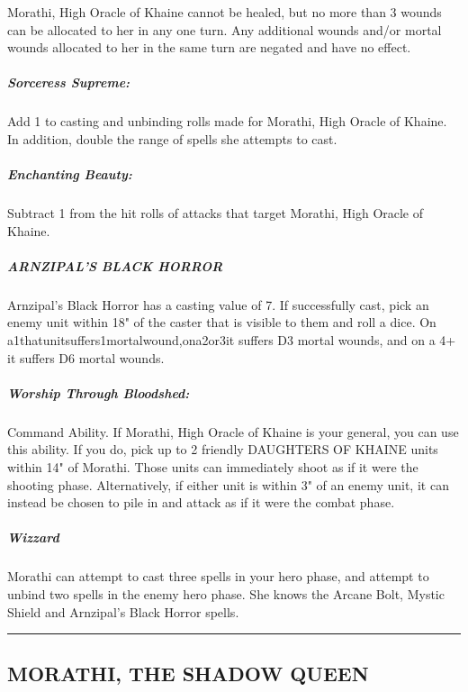 Morathi, High Oracle of Khaine cannot be healed, but no more than 3
wounds can be allocated to her in any one turn. Any additional wounds
and/or mortal wounds allocated to her in the same turn are negated and
have no effect.

\hypertarget{sorceress-supreme}{%
\subparagraph{Sorceress Supreme:}\label{sorceress-supreme}}

Add 1 to casting and unbinding rolls made for Morathi, High Oracle of
Khaine. In addition, double the range of spells she attempts to cast.

\hypertarget{enchanting-beauty}{%
\subparagraph{Enchanting Beauty:}\label{enchanting-beauty}}

Subtract 1 from the hit rolls of attacks that target Morathi, High
Oracle of Khaine.

\hypertarget{arnzipals-black-horror}{%
\subparagraph{ARNZIPAL'S BLACK HORROR}\label{arnzipals-black-horror}}

Arnzipal's Black Horror has a casting value of 7. If successfully cast,
pick an enemy unit within 18" of the caster that is visible to them and
roll a dice. On a1thatunitsuffers1mortalwound,ona2or3it suffers D3
mortal wounds, and on a 4+ it suffers D6 mortal wounds.

\hypertarget{worship-through-bloodshed}{%
\subparagraph{Worship Through
Bloodshed:}\label{worship-through-bloodshed}}

Command Ability. If Morathi, High Oracle of Khaine is your general, you
can use this ability. If you do, pick up to 2 friendly DAUGHTERS OF
KHAINE units within 14" of Morathi. Those units can immediately shoot as
if it were the shooting phase. Alternatively, if either unit is within
3" of an enemy unit, it can instead be chosen to pile in and attack as
if it were the combat phase.

\hypertarget{wizzard}{%
\subparagraph{Wizzard}\label{wizzard}}

Morathi can attempt to cast three spells in your hero phase, and attempt
to unbind two spells in the enemy hero phase. She knows the Arcane Bolt,
Mystic Shield and Arnzipal's Black Horror spells.

\begin{center}\rule{0.5\linewidth}{\linethickness}\end{center}

\hypertarget{morathi-the-shadow-queen}{%
\subsection{MORATHI, THE SHADOW QUEEN}\label{morathi-the-shadow-queen}}

